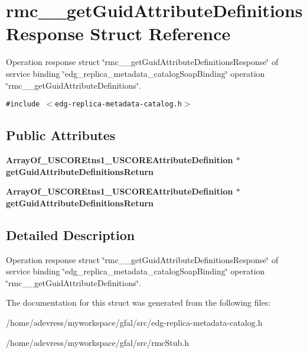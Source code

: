 \section{rmc\_\-\_\-get\-Guid\-Attribute\-Definitions\-Response Struct Reference}
\label{structrmc____getGuidAttributeDefinitionsResponse}
Operation response struct \char`\"{}rmc\_\-\_\-get\-Guid\-Attribute\-Definitions\-Response\char`\"{} of service binding \char`\"{}edg\_\-replica\_\-metadata\_\-catalog\-Soap\-Binding\char`\"{} operation \char`\"{}rmc\_\-\_\-get\-Guid\-Attribute\-Definitions\char`\"{}.  


{\tt \#include $<$edg-replica-metadata-catalog.h$>$}

\subsection*{Public Attributes}
\begin{CompactItemize}
\item 
\bf{Array\-Of\_\-USCOREtns1\_\-USCOREAttribute\-Definition} $\ast$ \textbf{get\-Guid\-Attribute\-Definitions\-Return}\label{structrmc____getGuidAttributeDefinitionsResponse_f9c4555460ca273e5c3ce54848cf82a9}

\item 
\bf{Array\-Of\_\-USCOREtns1\_\-USCOREAttribute\-Definition} $\ast$ \textbf{get\-Guid\-Attribute\-Definitions\-Return}\label{structrmc____getGuidAttributeDefinitionsResponse_f9c4555460ca273e5c3ce54848cf82a9}

\end{CompactItemize}


\subsection{Detailed Description}
Operation response struct \char`\"{}rmc\_\-\_\-get\-Guid\-Attribute\-Definitions\-Response\char`\"{} of service binding \char`\"{}edg\_\-replica\_\-metadata\_\-catalog\-Soap\-Binding\char`\"{} operation \char`\"{}rmc\_\-\_\-get\-Guid\-Attribute\-Definitions\char`\"{}. 



The documentation for this struct was generated from the following files:\begin{CompactItemize}
\item 
/home/adevress/myworkspace/gfal/src/edg-replica-metadata-catalog.h\item 
/home/adevress/myworkspace/gfal/src/rmc\-Stub.h\end{CompactItemize}
